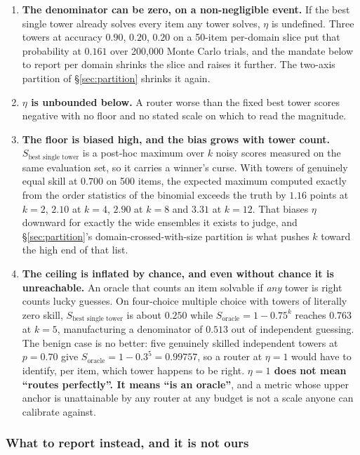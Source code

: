 \documentclass[11pt]{article}
\begin{document}
\begin{enumerate}[label=(E\arabic*),itemsep=3pt]
\item \textbf{The denominator can be zero, on a non-negligible event.} If the best single tower already solves every item any tower solves, $\eta$ is undefined. Three towers at accuracy $0.90$, $0.20$, $0.20$ on a 50-item per-domain slice put that probability at $0.161$ over 200{,}000 Monte Carlo trials, and the mandate below to report per domain shrinks the slice and raises it further. The two-axis partition of \S\ref{sec:partition} shrinks it again.
\item \textbf{$\eta$ is unbounded below.} A router worse than the fixed best tower scores negative with no floor and no stated scale on which to read the magnitude.
\item \textbf{The floor is biased high, and the bias grows with tower count.} $S_{\text{best single tower}}$ is a post-hoc maximum over $k$ noisy scores measured on the same evaluation set, so it carries a winner's curse. With towers of genuinely equal skill at $0.700$ on 500 items, the expected maximum computed exactly from the order statistics of the binomial exceeds the truth by $1.16$ points at $k=2$, $2.10$ at $k=4$, $2.90$ at $k=8$ and $3.31$ at $k=12$. That biases $\eta$ downward for exactly the wide ensembles it exists to judge, and \S\ref{sec:partition}'s domain-crossed-with-size partition is what pushes $k$ toward the high end of that list.
\item \textbf{The ceiling is inflated by chance, and even without chance it is unreachable.} An oracle that counts an item solvable if \emph{any} tower is right counts lucky guesses. On four-choice multiple choice with towers of literally zero skill, $S_{\text{best single tower}}$ is about $0.250$ while $S_{\text{oracle}} = 1 - 0.75^k$ reaches $0.763$ at $k=5$, manufacturing a denominator of $0.513$ out of independent guessing. The benign case is no better: five genuinely skilled independent towers at $p = 0.70$ give $S_{\text{oracle}} = 1 - 0.3^5 = 0.99757$, so a router at $\eta = 1$ would have to identify, per item, which tower happens to be right. \textbf{$\eta = 1$ does not mean ``routes perfectly''. It means ``is an oracle''}, and a metric whose upper anchor is unattainable by any router at any budget is not a scale anyone can calibrate against.
\end{enumerate}

\subsubsection*{What to report instead, and it is not ours}
\end{document}
